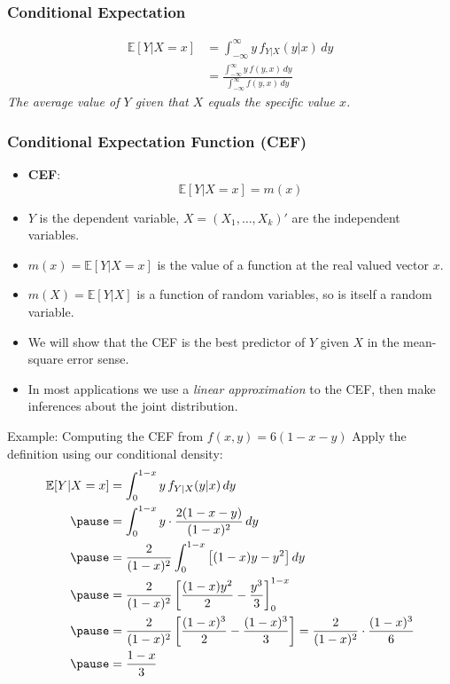 \documentclass[aspectratio=169, handout, t]{beamer}
\numberwithin{equation}{section}
\begin{document}



\begin{frame}
\frametitle{Conditional Expectation}
\begin{align*}
\mathbb{E}[Y|X=x]&=\int_{-\infty}^{\infty} y\, f_{Y|X}(y|x)\,dy\\
&=\frac{\int_{-\infty}^{\infty} y\, f(y,x)\,dy}{\int_{-\infty}^{\infty} f(y,x)\,dy}
\end{align*}
\smallskip
\emph{The average value of $Y$ given that $X$ equals the specific value $x$.}
\end{frame}

\begin{frame}
\frametitle{Conditional Expectation Function (CEF)}
\begin{itemize}
\item \textbf{CEF}:
$$\mathbb{E}[Y|X=x]=m(x)$$
\item $Y$ is the dependent variable, $X=(X_1,\ldots, X_k)'$ are the independent variables.
\item $m(x)=\mathbb{E}[Y|X=x]$ is the value of a function at the real valued vector $x$.
\item $m(X)=\mathbb{E}[Y|X]$ is a function of random variables, so is itself a random variable.
\item We will show that the CEF is the best predictor of $Y$ given $X$ in the mean-square error sense.
\item In most applications we use a \emph{linear approximation} to the CEF, then make inferences about the joint distribution.
\end{itemize}
\end{frame}


\begin{frame}{Example: Computing the CEF from $f(x,y)=6(1-x-y)$}
\small
Apply the definition using our conditional density:
\begin{align*}
\mathbb{E}[Y|X=x]&=\int_0^{1-x} y\, f_{Y|X}(y|x)\,dy\\\pause
&=\int_0^{1-x} y\cdot\frac{2(1-x-y)}{(1-x)^2}\,dy\\\pause
&=\frac{2}{(1-x)^2}\int_0^{1-x} \left[(1-x)y-y^2\right]dy\\\pause
&=\frac{2}{(1-x)^2}\left[\frac{(1-x)y^2}{2}-\frac{y^3}{3}\right]_0^{1-x}\\\pause
&=\frac{2}{(1-x)^2}\left[\frac{(1-x)^3}{2}-\frac{(1-x)^3}{3}\right]
=\frac{2}{(1-x)^2}\cdot\frac{(1-x)^3}{6}\\\pause
&=\frac{1-x}{3}
\end{align*}
\end{frame}
\end{document}
